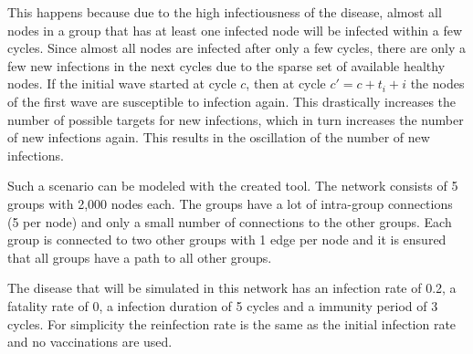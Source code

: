 This happens because due to the high infectiousness of the disease, almost all nodes in 
a group that has at least one infected node will be infected within a few cycles. Since
almost all nodes are infected after only a few cycles, there are only a few new infections 
in the next cycles due to the sparse set of available healthy nodes. If the initial
wave started at cycle $c$, then at cycle $c' = c + t_i + i$ the nodes of the first wave 
are susceptible to infection again. This drastically increases the number of possible targets for new infections, which in turn increases the number of new infections again. This results in 
the oscillation of the number of new infections.

Such a scenario can be modeled with the created tool. The network consists of 5 groups with 2,000 nodes each. The groups have a lot of intra-group connections (5 per node) and only a small number of connections to the
other groups. Each group is connected to two other groups with 1 edge per node and it is ensured that
all groups have a path to all other groups.

The disease that will be simulated in this network has an infection rate of 0.2, a fatality
rate of 0, a infection duration of 5 cycles and a immunity period of 3 cycles. For simplicity
the reinfection rate is the same as the initial infection rate and no vaccinations are used.

